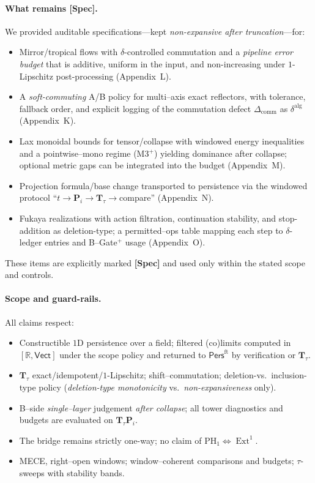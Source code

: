 \documentclass[11pt]{article}
\DeclareMathOperator{\Ext}{Ext}
\DeclareRobustCommand{\hyp}{\nobreakdash-}
\newcommand{\Pers}{\mathsf{Pers}}
\numberwithin{equation}{section}
\theoremstyle{definition}
\begin{document}
\paragraph{What remains \textup{[Spec]}.}
We provided auditable specifications—kept \emph{non\hyp expansive after truncation}—for:
\begin{itemize}
  \item Mirror/tropical flows with \(\delta\)\hyp controlled commutation and a \emph{pipeline error budget} that is additive, uniform in the input, and non\hyp increasing under \(1\)\hyp Lipschitz post\hyp processing (Appendix~L).
  \item A \emph{soft\hyp commuting} A/B policy for multi–axis exact reflectors, with tolerance, fallback order, and explicit logging of the commutation defect \(\Delta_{\mathrm{comm}}\) as \(\delta^{\mathrm{alg}}\) (Appendix~K).
  \item Lax monoidal bounds for tensor/collapse with windowed energy inequalities and a pointwise–mono regime (M3\(^{+}\)) yielding dominance after collapse; optional metric gaps can be integrated into the budget (Appendix~M).
  \item Projection formula/base change transported to persistence via the windowed protocol “\(t\)\(\to\)\(\mathbf{P}_i\)\(\to\)\(\mathbf{T}_\tau\)\(\to\)compare” (Appendix~N).
  \item Fukaya realizations with action filtration, continuation stability, and stop\hyp addition as deletion\hyp type; a permitted–ops table mapping each step to \(\delta\)\hyp ledger entries and B–Gate\(^{+}\) usage (Appendix~O).
\end{itemize}
These items are explicitly marked \textbf{[Spec]} and used only within the stated scope and controls.

\paragraph{Scope and guard\hyp rails.}
All claims respect:
\begin{itemize}
  \item Constructible \(1\)D persistence over a field; filtered (co)limits computed in \([\mathbb{R},\mathsf{Vect}]\) under the scope policy and returned to \(\Pers^{\mathrm{ft}}\) by verification or \(\mathbf{T}_\tau\).
  \item \(\mathbf{T}_\tau\) exact/idempotent/\(1\)\hyp Lipschitz; shift–commutation; deletion\hyp vs.\ inclusion\hyp type policy (\emph{deletion\hyp type monotonicity} vs.\ \emph{non\hyp expansiveness} only).
  \item B–side \emph{single–layer} judgement \emph{after collapse}; all tower diagnostics and budgets are evaluated on \(\mathbf{T}_\tau\mathbf{P}_i\).
  \item The bridge remains strictly one\hyp way; no claim of \(\mathrm{PH}_1\Leftrightarrow \Ext^1\).
  \item MECE, right–open windows; window–coherent comparisons and budgets; \(\tau\)\hyp sweeps with stability bands.
\end{itemize}
\end{document}

